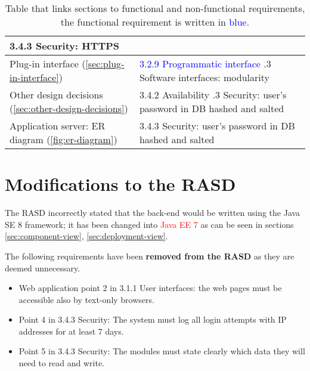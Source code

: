 \begin{table}[h]
\begin{center}
\begin{tabular}{|p{}|p{}|}
3.4.3 Security: HTTPS \\
\hline
Plug-in interface (\ref{sec:plug-in-interface}) & \textcolor{blue}{3.2.9 Programmatic interface} \newline
3.1.3 Software interfaces: modularity \\
\hline
Other design decisions (\ref{sec:other-design-decisions}) & 3.4.2 Availability \newline
3.4.3  Security: user's password in DB hashed and salted \\
\hline
Application server: ER diagram (\ref{fig:er-diagram}) & 3.4.3 Security: user's password in DB hashed and salted \\
\hline

\end{tabular}
\caption{Table that links sections to functional and non-functional requirements, the functional requirement is written in  \textcolor{blue}{blue}.}
\label{non-func-req}
\end{center}
\end{table}

\section{Modifications to the RASD}
\label{sec:RASD-changes}

The RASD incorrectly stated that the back-end would be written using the Java SE 8 framework; it has been changed into \textcolor{red}{Java EE 7} as can be seen in sections \ref{sec:component-view}, \ref{sec:deployment-view}.

The following requirements have been {\bf removed from the RASD} as they are deemed unnecessary.
\begin{itemize}
\item Web application point 2 in 3.1.1 User interfaces: the web pages must be accessible also by text-only browsers.
\item Point 4 in 3.4.3 Security: The system must log all login attempts with IP addresses for at least 7 days.
\item Point 5 in 3.4.3 Security: The modules must state clearly which data they will need to read and write.
\end{itemize}
